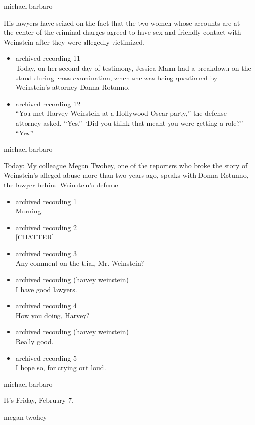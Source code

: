 michael barbaro

His lawyers have seized on the fact that the two women whose accounts
are at the center of the criminal charges agreed to have sex and
friendly contact with Weinstein after they were allegedly victimized.

\begin{itemize}
\item
  archived recording 11\\
  Today, on her second day of testimony, Jessica Mann had a breakdown on
  the stand during cross-examination, when she was being questioned by
  Weinstein's attorney Donna Rotunno.
\item
  archived recording 12\\
  ``You met Harvey Weinstein at a Hollywood Oscar party,'' the defense
  attorney asked. ``Yes.'' ``Did you think that meant you were getting a
  role?'' ``Yes.''
\end{itemize}

michael barbaro

Today: My colleague Megan Twohey, one of the reporters who broke the
story of Weinstein's alleged abuse more than two years ago, speaks with
Donna Rotunno, the lawyer behind Weinstein's defense

\begin{itemize}
\item
  archived recording 1\\
  Morning.
\item
  archived recording 2\\
  {[}CHATTER{]}
\item
  archived recording 3\\
  Any comment on the trial, Mr. Weinstein?
\item
  archived recording (harvey weinstein)\\
  I have good lawyers.
\item
  archived recording 4\\
  How you doing, Harvey?
\item
  archived recording (harvey weinstein)\\
  Really good.
\item
  archived recording 5\\
  I hope so, for crying out loud.
\end{itemize}

michael barbaro

It's Friday, February 7.

megan twohey

